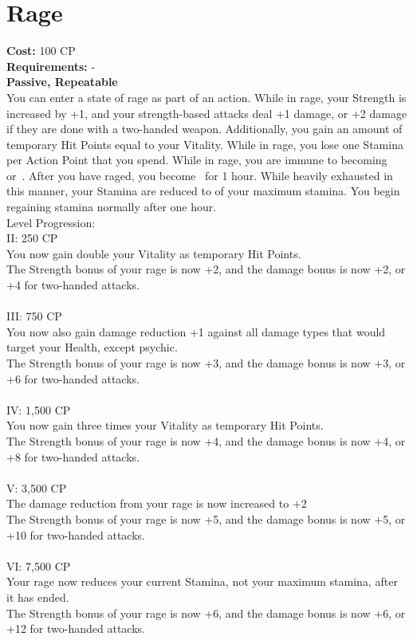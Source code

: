 \section{Rage}\label{perk:rage}
\textbf{Cost:} 100 CP\\
\textbf{Requirements:} -\\
\textbf{Passive, Repeatable}\\
You can enter a state of rage as part of an action.
While in rage, your Strength is increased by +1, and your strength-based attacks deal +1 damage, or +2 damage if they are done with a two-handed weapon.
Additionally, you gain an amount of temporary Hit Points equal to your Vitality.
While in rage, you lose one Stamina per Action Point that you spend.
While in rage, you are immune to becoming~ or~.
After you have raged, you become~ for 1 hour.
While heavily exhausted in this manner, your Stamina are reduced to  of your maximum stamina.
You begin regaining stamina normally after one hour.
\\
Level Progression:\\
II: 250 CP\\
You now gain double your Vitality as temporary Hit Points.\\
The Strength bonus of your rage is now +2, and the damage bonus is now +2, or +4 for two-handed attacks.\\
\\
III: 750 CP\\
You now also gain damage reduction +1 against all damage types that would target your Health, except psychic.\\
The Strength bonus of your rage is now +3, and the damage bonus is now +3, or +6 for two-handed attacks.\\
\\
IV: 1,500 CP\\
You now gain three times your Vitality as temporary Hit Points.\\
The Strength bonus of your rage is now +4, and the damage bonus is now +4, or +8 for two-handed attacks.\\
\\
V: 3,500 CP\\
The damage reduction from your rage is now increased to +2\\
The Strength bonus of your rage is now +5, and the damage bonus is now +5, or +10 for two-handed attacks.\\
\\
VI: 7,500 CP\\
Your rage now reduces your current Stamina, not your maximum stamina, after it has ended.\\
The Strength bonus of your rage is now +6, and the damage bonus is now +6, or +12 for two-handed attacks.\\
\\